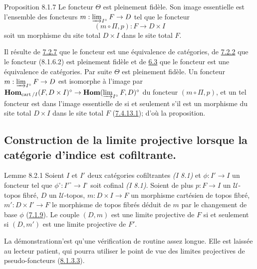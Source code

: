\documentclass[10pt]{../fichiers-configuration-latex/smfart}
\begin{document}
\begin{enonce*}{Proposition 8.1.7}
Le foncteur $\Theta$ est pleinement fidèle. Son image essentielle est
l'ensemble des foncteurs $m : \varinjlim_{I^{\circ}}F \to D$ tel que
le foncteur
$$
(m \circ \Pi, p) : F \to D \times I
$$
soit un morphisme du site total $D \times I$ dans le site total $F$.
\end{enonce*}

Il résulte de \hyperref[VI.prop7.2.7]{7.2.7} que le foncteur  est une équivalence de
catégories, de \hyperref[VI.subsubsec7.2.2]{7.2.2} que le foncteur (8.1.6.2) est pleinement fidèle
et de \hyperref[VI.def6.3]{6.3} que le foncteur  est une équivalence de
catégories. Par suite $\Theta$ est pleinement fidèle. Un foncteur $m :
\varinjlim_{I^{\circ}}F \to D$ est isomorphe à l'image
par $\Hhom_{\cart / I} (F, D \times I)^{\circ} \to \Hhom(
\varinjlim_{I^{\circ}}F, D)^{\circ}$ du foncteur $(m \circ
\Pi, p)$, et un tel foncteur est dans l'image essentielle de
 si et seulement s'il est un morphisme du site total $D
\times I$ dans le site total $F$ (\hyperref[VI.thm7.4.13.1]{7.4.13.1}); d'où la proposition.

\subsection{Construction de la limite projective lorsque la catégorie
  d'indice est cofiltrante.}

\begin{enonce*}{Lemme 8.2.1}
Soient $I$ et $I'$ deux catégories cofiltrantes \emph{(I 8.1)} et $\phi :
I'\to I$ un foncteur tel que $\phi^{\circ} : {I'}^{\circ} \to
I^{\circ}$ soit cofinal \emph{(I 8.1)}. Soient de plus $p : F \to I$ un $𝒰$-topos fibré, $D$ un
$𝒰$-topos, $m : D \times I \to F$ un morphisme cartésien de topos
fibré, $m': D \times I'\to F$ le morphisme de topos fibrés déduit de
$m$ par le changement de base $\phi$ (\hyperref[VI.subsubsec7.1.9]{7.1.9}). Le couple $(D, m)$ est
une limite projective de $F$ si et seulement si $(D, m')$ est une
limite projective de $F'$.
\end{enonce*}

La démonstration\pageoriginale n'est qu'une vérification de routine assez
longue. Elle est laissée au lecteur patient, qui pourra utiliser le
point de vue des limites projectives de pseudo-foncteurs (\hyperref[VI.par8.1.3.3]{8.1.3.3}).
\end{document}
